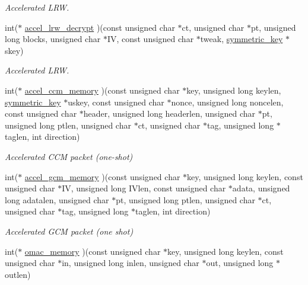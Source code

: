 \begin{DoxyCompactItemize}
\begin{DoxyCompactList}\small\item\em Accelerated L\+RW. \end{DoxyCompactList}\item 
int($\ast$ \mbox{\hyperlink{structltc__cipher__descriptor_a5fbfc5078761bc53d297e9a599884c1e}{accel\+\_\+lrw\+\_\+decrypt}} )(const unsigned char $\ast$ct, unsigned char $\ast$pt, unsigned long blocks, unsigned char $\ast$IV, const unsigned char $\ast$tweak, \mbox{\hyperlink{tomcrypt__cipher_8h_ac5a146550efe94c415d95abc7e454362}{symmetric\+\_\+key}} $\ast$skey)
\begin{DoxyCompactList}\small\item\em Accelerated L\+RW. \end{DoxyCompactList}\item 
int($\ast$ \mbox{\hyperlink{structltc__cipher__descriptor_ab3ee346b39a88e9c756fc2c835e4abf2}{accel\+\_\+ccm\+\_\+memory}} )(const unsigned char $\ast$key, unsigned long keylen, \mbox{\hyperlink{tomcrypt__cipher_8h_ac5a146550efe94c415d95abc7e454362}{symmetric\+\_\+key}} $\ast$uskey, const unsigned char $\ast$nonce, unsigned long noncelen, const unsigned char $\ast$header, unsigned long headerlen, unsigned char $\ast$pt, unsigned long ptlen, unsigned char $\ast$ct, unsigned char $\ast$tag, unsigned long $\ast$taglen, int direction)
\begin{DoxyCompactList}\small\item\em Accelerated C\+CM packet (one-\/shot) \end{DoxyCompactList}\item 
int($\ast$ \mbox{\hyperlink{structltc__cipher__descriptor_a6a2519c6c7563a41e3e2485a87ef0959}{accel\+\_\+gcm\+\_\+memory}} )(const unsigned char $\ast$key, unsigned long keylen, const unsigned char $\ast$IV, unsigned long I\+Vlen, const unsigned char $\ast$adata, unsigned long adatalen, unsigned char $\ast$pt, unsigned long ptlen, unsigned char $\ast$ct, unsigned char $\ast$tag, unsigned long $\ast$taglen, int direction)
\begin{DoxyCompactList}\small\item\em Accelerated G\+CM packet (one shot) \end{DoxyCompactList}\item 
int($\ast$ \mbox{\hyperlink{structltc__cipher__descriptor_af0b442d77ee8c5ef6806d0bc8a2c1b4a}{omac\+\_\+memory}} )(const unsigned char $\ast$key, unsigned long keylen, const unsigned char $\ast$in, unsigned long inlen, unsigned char $\ast$out, unsigned long $\ast$outlen)

\end{DoxyCompactItemize}
